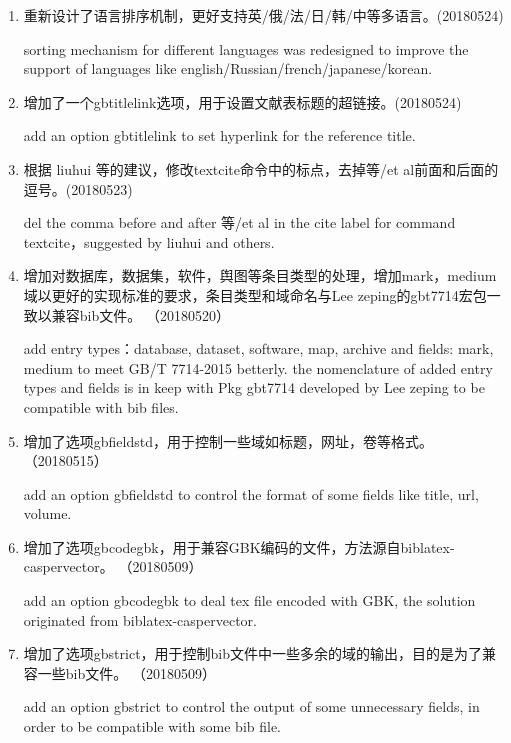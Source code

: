 
\label{up:180403}
\begin{enumerate}
\item 重新设计了语言排序机制，更好支持英/俄/法/日/韩/中等多语言。(20180524)

sorting mechanism for different languages was redesigned to improve the support of languages like english/Russian/french/japanese/korean.

\item 增加了一个gbtitlelink选项，用于设置文献表标题的超链接。(20180524)

add an option gbtitlelink to set hyperlink for the reference title.

\item 根据 liuhui 等的建议，修改textcite命令中的标点，去掉等/et al前面和后面的逗号。(20180523)

del the comma before and after 等/et al in the cite label for command textcite，suggested by liuhui and others.

\item 增加对数据库，数据集，软件，舆图等条目类型的处理，增加mark，medium域以更好的实现标准的要求，条目类型和域命名与Lee zeping的gbt7714宏包一致以兼容bib文件。 （20180520）

add entry types：database, dataset, software, map, archive and fields: mark, medium to meet GB/T 7714-2015 betterly. the nomenclature of added entry types and fields is in keep with Pkg gbt7714 developed by Lee zeping to be compatible with bib files.

\item 增加了选项gbfieldstd，用于控制一些域如标题，网址，卷等格式。 （20180515）

add an option gbfieldstd to control the format of some fields like title, url, volume.

\item 增加了选项gbcodegbk，用于兼容GBK编码的文件，方法源自biblatex-caspervector。 （20180509）

add an option gbcodegbk to deal tex file encoded with GBK, the solution originated from biblatex-caspervector.

\item 增加了选项gbstrict，用于控制bib文件中一些多余的域的输出，目的是为了兼容一些bib文件。 （20180509）

add an option gbstrict to control the output of some unnecessary fields, in order to be compatible with some bib file.


\end{enumerate}
